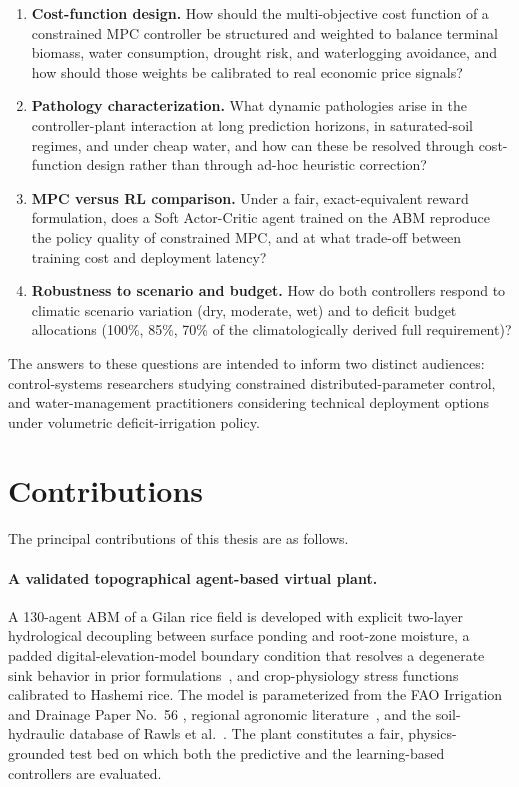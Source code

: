 \begin{enumerate}
\item \textbf{Cost-function design.} How should the multi-objective
cost function of a constrained MPC controller be structured and
weighted to balance terminal biomass, water consumption, drought
risk, and waterlogging avoidance, and how should those weights be
calibrated to real economic price signals?

\item \textbf{Pathology characterization.} What dynamic pathologies
arise in the controller-plant interaction at long prediction
horizons, in saturated-soil regimes, and under cheap water, and how
can these be resolved through cost-function design rather than
through ad-hoc heuristic correction?

\item \textbf{MPC versus RL comparison.} Under a fair, exact-equivalent
reward formulation, does a Soft Actor-Critic agent trained on the
ABM reproduce the policy quality of constrained MPC, and at what
trade-off between training cost and deployment latency?

\item \textbf{Robustness to scenario and budget.} How do both
controllers respond to climatic scenario variation (dry, moderate,
wet) and to deficit budget allocations (100\%, 85\%, 70\% of the
climatologically derived full requirement)?
\end{enumerate}

The answers to these questions are intended to inform two distinct
audiences: control-systems researchers studying constrained
distributed-parameter control, and water-management practitioners
considering technical deployment options under volumetric
deficit-irrigation policy.

\section{Contributions}
\label{sec:intro-contributions}

The principal contributions of this thesis are as follows.

\paragraph{A validated topographical agent-based virtual plant.}
A 130-agent ABM of a Gilan rice field is developed with explicit
two-layer hydrological decoupling between surface ponding and
root-zone moisture, a padded digital-elevation-model boundary
condition that resolves a degenerate sink behavior in prior
formulations~\cite{Lopezjimenez2024}, and crop-physiology stress
functions calibrated to Hashemi rice. The model is parameterized
from the FAO Irrigation and Drainage Paper No.~56
\cite{allen1998}, regional agronomic
literature~\cite{jalali2021,sadidi2021}, and the soil-hydraulic
database of Rawls et al.~\cite{rawls1982}. The plant constitutes a
fair, physics-grounded test bed on which both the predictive and the
learning-based controllers are evaluated.

